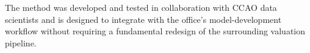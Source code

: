 \documentclass[10pt]{article}
\theoremstyle{definition}
\newcommand{\1}{\mathbf{1}}
\newcommand{\oldtext}[1]{\textcolor{blue}{\sout{#1}}}
\begin{document}
{The method was developed and tested in collaboration with CCAO data scientists and is designed to integrate with the office's model-development workflow without requiring a fundamental redesign of the surrounding valuation pipeline.}





\end{document}
